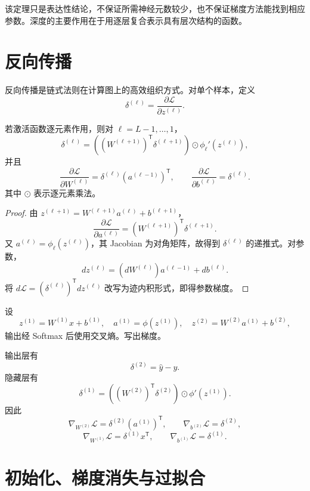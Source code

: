 该定理只是表达性结论，不保证所需神经元数较少，也不保证梯度方法能找到相应参数。深度的主要作用在于用逐层复合表示具有层次结构的函数。

\section{反向传播}

反向传播是链式法则在计算图上的高效组织方式。对单个样本，定义
\[
\delta^{(\ell)}
=\frac{\partial\mathcal L}{\partial z^{(\ell)}}.
\]

\begin{theorem}[全连接网络的反向传播公式]
若激活函数逐元素作用，则对
$\ell=L-1,\ldots,1$，
\[
\delta^{(\ell)}
=\left((W^{(\ell+1)})^{\mathsf T}
\delta^{(\ell+1)}\right)
\odot\phi_\ell'(z^{(\ell)}),
\]
并且
\[
\frac{\partial\mathcal L}{\partial W^{(\ell)}}
=\delta^{(\ell)}(a^{(\ell-1)})^{\mathsf T},
\qquad
\frac{\partial\mathcal L}{\partial b^{(\ell)}}
=\delta^{(\ell)}.
\]
其中 $\odot$ 表示逐元素乘法。
\end{theorem}
\begin{proof}
由
$z^{(\ell+1)}=W^{(\ell+1)}a^{(\ell)}+b^{(\ell+1)}$，
\[
\frac{\partial\mathcal L}{\partial a^{(\ell)}}
=(W^{(\ell+1)})^{\mathsf T}\delta^{(\ell+1)}.
\]
又 $a^{(\ell)}=\phi_\ell(z^{(\ell)})$，其 Jacobian 为对角矩阵，故得到 $\delta^{(\ell)}$ 的递推式。对参数，
\[
dz^{(\ell)}=(dW^{(\ell)})a^{(\ell-1)}+db^{(\ell)}.
\]
将 $d\mathcal L=(\delta^{(\ell)})^{\mathsf T}dz^{(\ell)}$ 改写为迹内积形式，即得参数梯度。
\end{proof}

\begin{example}[title={两层网络的梯度}]
设
\[
z^{(1)}=W^{(1)}x+b^{(1)},
\quad
a^{(1)}=\phi(z^{(1)}),
\quad
z^{(2)}=W^{(2)}a^{(1)}+b^{(2)},
\]
输出经 Softmax 后使用交叉熵。写出梯度。
\begin{solution}
输出层有
\[
\delta^{(2)}=\widehat y-y.
\]
隐藏层有
\[
\delta^{(1)}
=((W^{(2)})^{\mathsf T}\delta^{(2)})
\odot\phi'(z^{(1)}).
\]
因此
\[
\nabla_{W^{(2)}}\mathcal L
=\delta^{(2)}(a^{(1)})^{\mathsf T},
\qquad
\nabla_{b^{(2)}}\mathcal L=\delta^{(2)},
\]
\[
\nabla_{W^{(1)}}\mathcal L
=\delta^{(1)}x^{\mathsf T},
\qquad
\nabla_{b^{(1)}}\mathcal L=\delta^{(1)}.
\]
\end{solution}
\end{example}

\section{初始化、梯度消失与过拟合}

